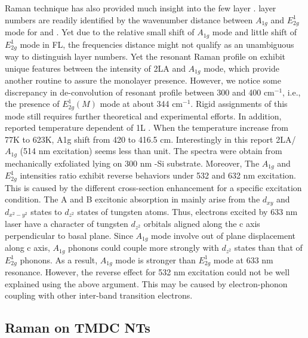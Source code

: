 Raman technique has also provided much insight into the few layer .  layer numbers are readily identified by the wavenumber distance between $A_{1g}$ and $E_{2g}^1$ mode for \cite{Buscema2013} and \cite{Berkdemir2013}. Yet due to the relative small shift of $A_{1g}$ mode and little shift of $E_{2g}^1$ mode in  FL, the frequencies distance might not qualify as an unambiguous way to distinguish layer numbers. Yet the resonant Raman profile on  exhibit unique features between the intensity of 2LA and $A_{1g}$ mode,\cite{Berkdemir2013,Zhao2013} which provide another routine to assure the monolayer presence. However, we notice some discrepancy in de-convolution of  resonant profile between 300 and 400 cm$^{-1}$, i.e., the presence of $E_{2g}^1(M)$ mode at about 344 cm$^{-1}$.\cite{Peimyoo2013,Cong2013,Berkdemir2013} Rigid assignments of this mode still requires further theoretical\cite{Ataca2012} and experimental efforts. In addition, \citeauthor{M2013} reported temperature dependent of 1L .\cite{M2013} When the temperature increase from 77K to 623K, A1g shift from 420 to 416.5 cm. Interestingly in this report 2LA/$A_{1g}$ (514 nm excitation) seems less than unit. The spectra were obtain from mechanically exfoliated  lying on 300 nm -Si substrate. Moreover, The $A_{1g}$ and $E_{2g}^1$ intensities ratio exhibit reverse behaviors under 532 and 632 nm excitation. This is caused by the different cross-section enhancement for a specific excitation condition. The A and B excitonic absorption in  mainly arise from the $d_{xy}$ and $d_{x^2 - y^2}$ states to $d_{z^2}$ states of tungsten atoms. Thus, electrons excited by 633 nm laser have a character of tungsten $d_{z^2}$ orbitals aligned along the c axis perpendicular to  basal plane. Since $A_{1g}$ mode involve out of plane displacement along c axis, $A_{1g}$ phonons could couple more strongly with $d_{z^2}$ states than that of $E_{2g}^1$ phonons. As a result, $A_{1g}$ mode is stronger than $E_{2g}^1$ mode at 633 nm resonance.\cite{Zhao2013} However, the reverse effect for 532 nm excitation could not be well explained using the above argument. This may be caused by electron-phonon coupling with other inter-band transition electrons.

\subsection{Raman on TMDC NTs}\label{sec:ntram}

